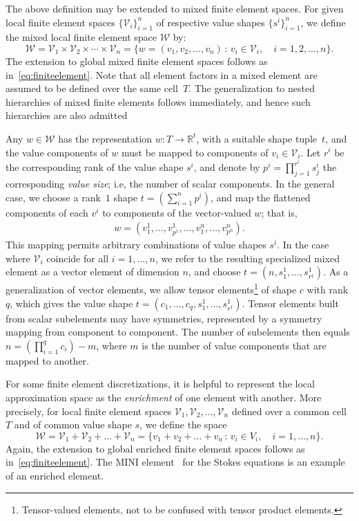 \documentclass[prodmode,acmtoms]{acmsmall}
\newcommand{\R}{\mathbb{R}}
\begin{document}
The above definition may be extended to mixed finite element spaces.
For given local finite element spaces $\{\mathcal{V}_i\}_{i=1}^{n}$ of
respective value shapes $\{s^i\}_{i=1}^{n}$, we define the mixed local
finite element space $\mathcal{W}$ by:
\begin{equation}
  \mathcal{W} = \mathcal{V}_1 \times \mathcal{V}_2 \times \cdots \times \mathcal{V}_n
  = \{w = (v_1, v_2, \ldots, v_n) \,:\, v_i \in \mathcal{V}_i, \quad i=1,2,\ldots,n\}.
\end{equation}
The extension to global mixed finite element spaces follows as
in~\eqref{eq:finiteelement}.  Note that all element factors in a mixed
element are assumed to be defined over the same cell~$T$. The
generalization to nested hierarchies of mixed finite elements follows
immediately, and hence such hierarchies are also admitted

Any $w \in \mathcal{W}$ has the representation $w: T \rightarrow
\R^{t}$, with a suitable shape tuple~$t$, and the value components of
$w$ must be mapped to components of $v_i \in \mathcal{V}_i$. Let $r^i$
be the corresponding rank of the value shape $s^i$, and denote by
$p^i=\prod_{j=1}^{r^i} s^i_j$ the corresponding \emph{value size};
i.e, the number of scalar components. In the general case, we choose a
rank~$1$ shape $t = (\sum_{i=1}^n p^i)$, and map the flattened
components of each $v^i$ to components of the vector-valued $w$; that
is,
\begin{align}
  w = (v^1_1, \ldots, v^1_{p^1}, \ldots, v^n_1, \ldots, v^n_{p^n}).
\end{align}
This mapping permits arbitrary combinations of value shapes $s^i$. In
the case where $\mathcal{V}_i$ coincide for all $i = 1, \dots, n$, we refer to
the resulting specialized mixed element as a vector element of
dimension $n$, and choose $t=(n, s^1_1, \ldots, s^1_{r^1})$. As a
generalization of vector elements, we allow tensor
elements\footnote{Tensor-valued elements, not to be confused with
  tensor product elements.} of shape $c$ with rank~$q$, which gives
the value shape $t=(c_1, \ldots, c_q, s^1_1, \ldots,
s^1_{r^1})$. Tensor elements built from scalar subelements may have
symmetries, represented by a symmetry mapping from component to
component.  The number of subelements then equals
$n=\left(\prod_{i=1}^{q} c_i\right)-m$, where $m$ is the number of
value components that are mapped to another.

For some finite element discretizations, it is helpful to represent
the local approximation space as the \emph{enrichment} of one element
with another. More precisely, for local finite element spaces
$\mathcal{V}_1, \mathcal{V}_2, \dots, \mathcal{V}_n$ defined over a
common cell $T$ and of common value shape $s$, we define the space
\begin{equation}
  \mathcal{W} = \mathcal{V}_1 + \mathcal{V}_2 + \dots + \mathcal{V}_n
  = \{ v_1 + v_2 + \dots + v_n \,:\, v_i \in V_i, \quad i = 1, \dots, n \}.
\end{equation}
Again, the extension to global enriched finite element spaces follows
as in~\eqref{eq:finiteelement}. The MINI
element~\citep{ArnoldBrezziFortin1984} for the Stokes equations is an
example of an enriched element.
\end{document}
